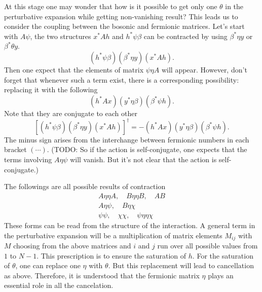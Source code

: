 At this stage one may wonder that how is it possible to get only one $\theta$ in the perturbative expansion while getting non-vanishing result?
This leads us to consider the coupling between the bosonic and fermionic matrices.
Let's start with $A \psi$, the two structures $ x^* A h $ and $h^* \psi \beta$ can be contracted by using $\beta^* \eta y$ or $\beta^* \theta y$.
\[
	(h^* \psi \beta) (\beta^* \eta y) (x^* A h)
.\] 
Then one expect that the elements of matrix $\psi \eta A$ will appear.
However, don't forget that whenever such a term exist, there is a corresponding possibility: replacing it with the following
\[
	(h^* A x) (y^* \eta \beta) (\beta^* \psi h)
.\] 
Note that they are conjugate to each other
\[
	\left[(h^* \psi \beta) (\beta^* \eta y) (x^* A h)\right]^\dagger = - 
	(h^* A x) (y^* \eta \beta) (\beta^* \psi h)
.\] 
The minus sign arises from the interchange between fermionic numbers in each bracket $(\cdots)$.
(TODO: So if the action is self-conjugate, one expects that the terms involving $A \eta \psi$ will vanish. But it's not clear that the action is self-conjugate.)

The followings are all possible results of contraction
\begin{align*}
	A \eta \eta A,\quad B \eta \eta B,\quad AB \\
	A\eta \psi,\quad B \eta \chi \\
	\psi \psi,\quad \chi \chi,\quad \psi \eta \eta \chi
\end{align*}
These forms can be read from the structure of the interaction.
A general term in the perturbative expansion will be a multiplication of matrix elements $M_{ij}$ with $M$ choosing from the above matrices and $i$ and $j$ run over all possible values from $1$ to $N-1$.
This prescription is to ensure the saturation of $h$.
For the saturation of $\theta$, one can replace one $\eta$ with $\theta$.
But this replacement will lead to cancellation as above.
Therefore, it is understood that the fermionic matrix $\eta$ plays an essential role in all the cancelation.
